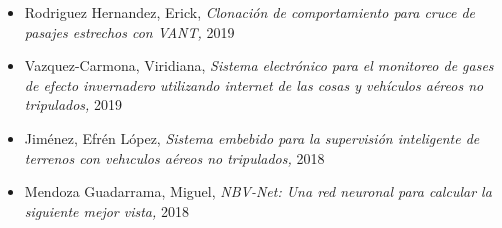 \begin{itemize} 
\item Rodriguez Hernandez, Erick, \textit{ Clonaci\'on de comportamiento para cruce de pasajes estrechos con VANT,} 2019 
\item Vazquez-Carmona, Viridiana, \textit{ Sistema electr\'onico para el monitoreo de gases de efecto invernadero utilizando internet de las cosas y veh\'iculos a\'ereos no tripulados,} 2019 
\item Jim{\'e}nez, Efr{\'e}n L{\'o}pez, \textit{ Sistema embebido para la supervisi{\'o}n inteligente de terrenos con veh{\i}culos a{\'e}reos no tripulados,} 2018 
\item Mendoza Guadarrama, Miguel, \textit{ NBV-Net: Una red neuronal para calcular la siguiente mejor vista,} 2018 
\end{itemize} 
